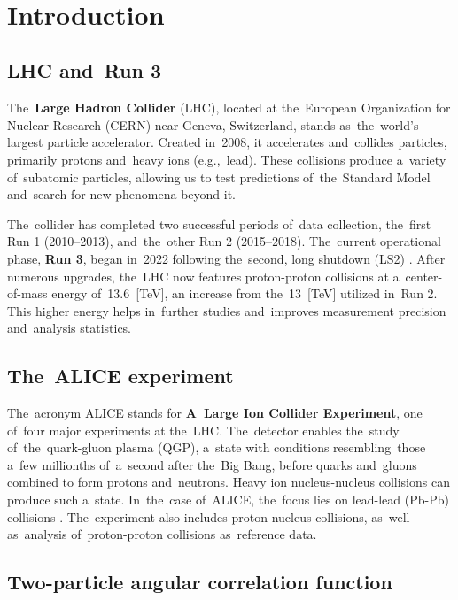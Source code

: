 \documentclass[11pt,a4paper,twoside]{book}
\numberwithin{equation}{chapter}
\begin{document}
\newpage
\mbox{ }

\tableofcontents
{}
\pagestyle{empty}

\chapter{Introduction}
\pagestyle{fancy}

\section{LHC and Run 3}

The \textbf{Large Hadron Collider} (LHC), located at the European Organization for Nuclear Research (CERN) near Geneva, Switzerland, stands as the world's largest particle accelerator. Created in 2008, it accelerates and collides particles, primarily protons and heavy ions (e.g., lead). These collisions produce a variety of subatomic particles, allowing us to test predictions of the Standard Model and search for new phenomena beyond it.

The collider has completed two successful periods of data collection, the first Run 1 (2010--2013), and the other Run 2 (2015--2018). The current operational phase, \textbf{Run 3}, began in 2022 following the second, long shutdown (LS2) \cite{lhc-upgrade}. After numerous upgrades, the LHC now features proton-proton collisions at a center-of-mass energy of 13.6 [TeV], an increase from the 13 [TeV] utilized in Run 2. This higher energy helps in further studies and improves measurement precision and analysis statistics.

\section{The ALICE experiment}

The acronym ALICE stands for \textbf{A Large Ion Collider Experiment}, one of four major experiments at the LHC. The detector enables the study of the quark-gluon plasma (QGP), a state with conditions resembling those a few millionths of a second after the Big Bang, before quarks and gluons combined to form protons and neutrons. Heavy ion nucleus-nucleus collisions can produce such a state. In the case of ALICE, the focus lies on lead-lead (Pb-Pb) collisions \cite{alice-cern}. The experiment also includes proton-nucleus collisions, as well as analysis of proton-proton collisions as reference data.

\section{Two-particle angular correlation function}
\end{document}
